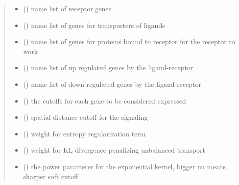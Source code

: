 \documentclass[letterpaper,10pt,english]{sphinxmanual}
\begin{document}
\begin{fulllineitems}
\begin{fulllineitems}
\begin{quote}
\begin{description}
\begin{itemize}
\item {} 
 () \textendash{} name list of receptor genes

\item {} 
 (\sphinxstyleliteralemphasis{, }) \textendash{} name list of genes for transporters of ligands

\item {} 
 (\sphinxstyleliteralemphasis{, }) \textendash{} name list of genes for proteins bound to receptor for the receptor to work

\item {} 
 () \textendash{} name list of up regulated genes by the ligand-receptor

\item {} 
 () \textendash{} name list of down regulated genes by the ligand-receptor

\item {} 
 (\sphinxstyleliteralemphasis{ (}\sphinxstyleliteralemphasis{)}\sphinxstyleliteralemphasis{, }) \textendash{} the cutoffs for each gene to be considered expressed

\item {} 
 () \textendash{} spatial distance cutoff for the signaling

\item {} 
 (\sphinxstyleliteralemphasis{, }) \textendash{} weight for entropy regularization term

\item {} 
 (\sphinxstyleliteralemphasis{, }) \textendash{} weight for KL divergence penalizing unbalanced transport

\item {} 
 (\sphinxstyleliteralemphasis{, }) \textendash{} the power parameter for the exponential kernel, bigger nu means sharper soft cutoff


\end{itemize}
\end{description}
\end{quote}
\end{fulllineitems}
\end{fulllineitems}
\end{document}

